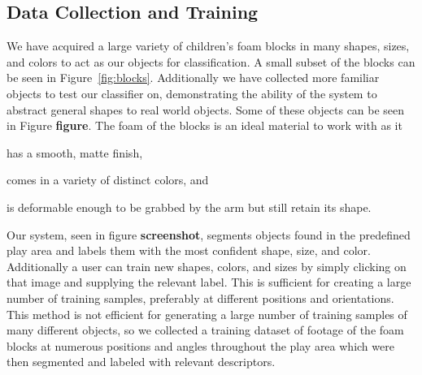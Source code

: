 \documentclass[11pt]{article}
\newcommand{\meh}[1]{{\bf \color{blue} #1}}
\begin{document}
\subsection{Data Collection and Training}
We have acquired a large variety of children's foam blocks in many shapes, sizes,
and colors to act as our objects for classification. A small subset of the
blocks can be seen in Figure~\ref{fig:blocks}. Additionally we have collected
more familiar objects to test our classifier on, demonstrating the ability of
the system to abstract general shapes to real world objects. Some of these
objects can be seen in Figure \meh{figure}. The foam of the blocks is an
ideal material to work with as it
\begin{inparaenum}[(1)]
\item has a smooth, matte finish,
\item comes in a variety of distinct colors, and
\item is deformable enough to be grabbed by the arm but still retain its
shape.
\end{inparaenum}


Our system, seen in figure \meh{screenshot}, segments objects found in the
predefined play area and labels them with the most confident shape, size, and
color.  Additionally a user can train new shapes, colors, and sizes by simply
clicking on that image and supplying the relevant label.  This is sufficient
for creating a large number of training samples, preferably at different
positions and orientations.  This method is not efficient for generating a
large number of training samples of many different objects, so we collected a
training dataset of footage of the foam blocks at numerous positions and angles throughout the play area which were then segmented and labeled with relevant
descriptors.
\end{document}
